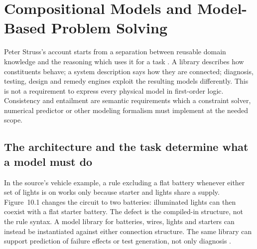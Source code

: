 \chapter{Compositional Models and Model-Based Problem Solving}
\label{sec:p16-qualitative-compositional-model-formulation}

Peter Struss's account starts from a separation between reusable domain
knowledge and the reasoning which uses it for a task
\cite[secs.~10.1--10.3]{Struss2008ModelBasedProblemSolving}.
A library describes how constituents behave; a system description says how
they are connected; diagnosis, testing, design and remedy engines exploit
the resulting models differently. This is not a requirement to express every
physical model in first-order logic. Consistency and entailment are semantic
requirements which a constraint solver, numerical predictor or other modeling
formalism must implement at the needed scope.

\section{The architecture and the task determine what a model must do}
\label{sec:p16-cm-tasks}

In the source's vehicle example, a rule excluding a flat battery whenever
either set of lights is on works only because starter and lights share a
supply. Figure~10.1 changes the circuit to two batteries: illuminated lights
can then coexist with a flat starter battery. The defect is the compiled-in
structure, not the rule syntax. A model library for batteries, wires, lights
and starters can instead be instantiated against either connection structure.
The same library can support prediction of failure effects or test generation,
not only diagnosis \cite[pp.~395--397]{Struss2008ModelBasedProblemSolving}.

